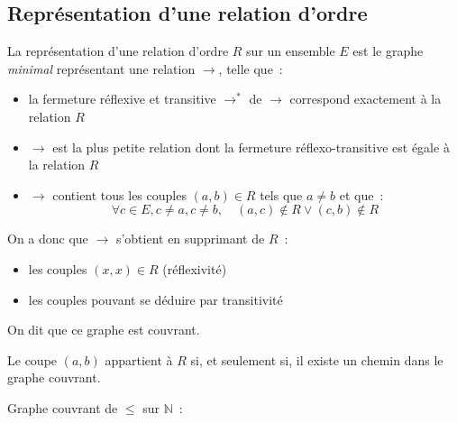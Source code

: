 \documentclass[a4paper, titlepage]{article}
\begin{document}
    \subsection{Représentation d'une relation d'ordre}
    \begin{defn}
        La représentation d'une relation d'ordre $R$ sur un ensemble $E$ est le graphe \textit{minimal} représentant
        une relation $\to$, telle que~:
        \begin{itemize}
            \item la fermeture réflexive et transitive $\to^*$ de $\to$ correspond exactement à la relation $R$
            \item $\to$ est la plus petite relation dont la fermeture réflexo-transitive est égale à la relation $R$
            \item $\to$ contient tous les couples $(a,b)\in R$ tels que $a\neq b$ et que~:
                $$ \forall c\in E, c\neq a, c\neq b,\quad (a,c)\not\in R\lor (c,b)\not\in R $$
        \end{itemize}
        On a donc que $\to$ s'obtient en supprimant de $R$~:
        \begin{itemize}
            \item les couples $(x,x)\in R$ (réflexivité)
            \item les couples pouvant se déduire par transitivité 
        \end{itemize}
        On dit que ce graphe est couvrant.
    \end{defn}
    \begin{props}
        Le coupe $(a,b)$ appartient à $R$ si, et seulement si, il existe un chemin dans le graphe couvrant.
    \end{props}
    \begin{exemple}
        Graphe couvrant de $\leqslant$ sur $\mathbb{N}$~:

    \end{exemple}
\end{document}
